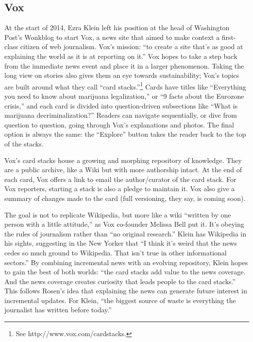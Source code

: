 \subsection{Vox}

At the start of 2014, Ezra Klein left his position at the head of Washington Post's Wonkblog to start Vox, a news site that aimed to make context a first-class citizen of web journalism. Vox's mission: ``to create a site that's as good at explaining the world as it is at reporting on it.''\autocite{} Vox hopes to take a step back from the immediate news event and place it in a larger phenomenon. Taking the long view on stories also gives them an eye towards sustainability; Vox's topics are built around what they call ``card stacks.''\footnote{See http://www.vox.com/cardstacks.} Cards have titles like ``Everything you need to know about marijuana legalization,'' or ``9 facts about the Eurozone crisis,'' and each card is divided into question-driven subsections like ``What is marijuana decriminalization?'' Readers can navigate sequentially, or dive from question to question, going through Vox's explanations and photos. The final option is always the same: the ``Explore'' button takes the reader back to the top of the stacks.

Vox's card stacks house a growing and morphing repository of knowledge. They are a public archive, like a Wiki but with more authorship intact. At the end of each card, Vox offers a link to email the author/curator of the card stack. For Vox reporters, starting a stack is also a pledge to maintain it. Vox also give a summary of changes made to the card (full versioning, they say, is coming soon).

The goal is not to replicate Wikipedia, but more like a wiki ``written by one person with a little attitude,'' as Vox co-founder Melissa Bell put it. It's obeying the rules of journalism rather than ``no original research.''  Klein has Wikipedia in his sights, suggesting in the New Yorker that ``I think it's weird that the news cedes so much ground to Wikipedia. That isn't true in other informational sectors.'' By combining incremental news with an evolving repository, Klein hopes to gain the best of both worlds: ``the card stacks add value to the news coverage. And the news coverage creates curiosity that leads people to the card stacks.'' This follows Rosen's idea that explaining the news can generate future interest in incremental updates. For Klein, ``the biggest source of waste is everything the journalist has written before today.''\autocite{nyt_vox_melding} 

